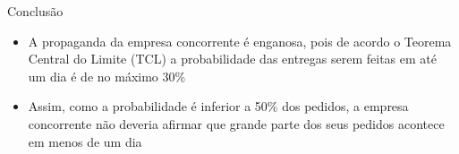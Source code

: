 \documentclass[aspectratio=169,14pt]{beamer}
\begin{document}
\begin{frame}{Conclusão}
    \begin{itemize}
        \item A propaganda da empresa concorrente é enganosa, pois de acordo o
        Teorema Central do Limite (TCL) a probabilidade das entregas serem
        feitas em até um dia é de no máximo 30\%
        \item Assim, como a probabilidade é inferior a 50\% dos pedidos, a
        empresa concorrente não deveria afirmar que grande parte dos seus
        pedidos acontece em menos de um dia
    \end{itemize}
\end{frame}
\end{document}

